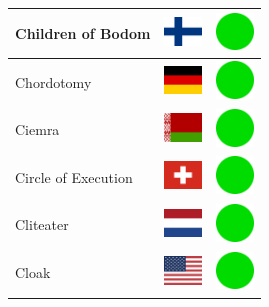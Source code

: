 \documentclass[12pt, a4paper, twoside]{report}
\begin{document}
\begin{center}
\begin{longtable}{|p{5cm}|p{2cm}|p{2cm}|}
 Children of Bodom                                          & \includegraphics[width=1cm]{../img/flags/fi} &   \includegraphics[width=1cm]{../likes/y} \\ \hline
 Chordotomy                                                 & \includegraphics[width=1cm]{../img/flags/de} &   \includegraphics[width=1cm]{../likes/y} \\ \hline
 Ciemra                                                     & \includegraphics[width=1cm]{../img/flags/by} &   \includegraphics[width=1cm]{../likes/y} \\ \hline
 Circle of Execution                                        & \includegraphics[width=1cm]{../img/flags/ch} &   \includegraphics[width=1cm]{../likes/y} \\ \hline
 Cliteater                                                  & \includegraphics[width=1cm]{../img/flags/nl} &   \includegraphics[width=1cm]{../likes/y} \\ \hline
 Cloak                                                      & \includegraphics[width=1cm]{../img/flags/us} &   \includegraphics[width=1cm]{../likes/y} \\ \hline

\end{longtable}
\end{center}
\end{document}
